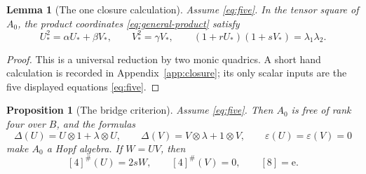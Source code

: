 \documentclass[11pt]{amsart}
\newtheorem{proposition}[theorem]{Proposition}
\newtheorem{lemma}[theorem]{Lemma}
\theoremstyle{definition}
\theoremstyle{remark}
\newcommand{\eps}{\varepsilon}
\newcommand{\ot}{\otimes}
\newcommand{\unit}{\mathrm e}
\begin{document}
\begin{lemma}[The one closure calculation]\label{lem:closure}
Assume \eqref{eq:five}.  In the tensor square of \(A_0\), the product
coordinates \eqref{eq:general-product} satisfy
\begin{equation}\label{eq:three-closure-identities}
 U_*^2=\alpha U_*+\beta V_*,
 \qquad
 V_*^2=\gamma V_*,
 \qquad
 (1+rU_*)(1+sV_*)=\lambda_1\lambda_2.
\end{equation}
\end{lemma}

\begin{proof}
This is a universal reduction by two monic quadrics.  A short hand
calculation is recorded in Appendix~\ref{app:closure}; its only scalar
inputs are the five displayed equations \eqref{eq:five}.
\end{proof}

\begin{proposition}[The bridge criterion]\label{prop:bridge}
Assume \eqref{eq:five}.  Then \(A_0\) is free of rank four over \(B\),
and the formulas
\[
 \Delta(U)=U\ot1+\lambda\ot U,\qquad
 \Delta(V)=V\ot\lambda+1\ot V,\qquad
 \eps(U)=\eps(V)=0
\]
make \(A_0\) a Hopf algebra.  If \(W=UV\), then
\begin{equation}\label{eq:general-power}
 [4]^\#(U)=2sW,\qquad [4]^\#(V)=0,\qquad [8]=\unit.
\end{equation}
\end{proposition}
\end{document}
